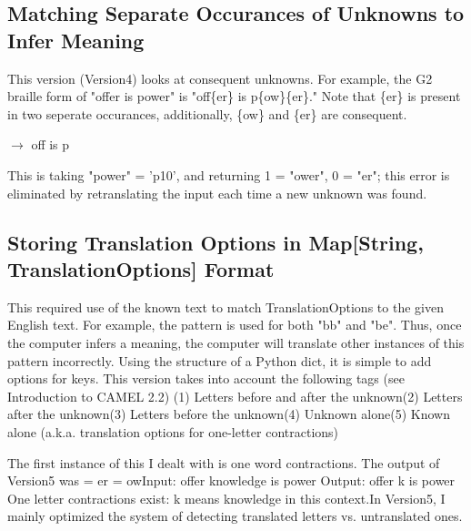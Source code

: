 \documentclass[26pt]{article}
\newcommand*{\code}{\fontfamily{pcr}\selectfont}
\begin{document}
\subsection{Matching Separate Occurances of Unknowns to Infer Meaning}

This version (Version4) looks at consequent unknowns. For example, the G2 braille form of "offer is power" is "off\{er\} is p\{ow\}\{er\}." Note that \{er\} is present in two seperate occurances, additionally, \{ow\} and \{er\} are consequent. 

 $\rightarrow$ off is p 

This is taking "power" = 'p10', and returning 1 = "ower", 0 = "er"; this error is eliminated by retranslating the input each time a new unknown was found.
\newline\newline 

\subsection{Storing Translation Options in Map[String, TranslationOptions] Format}
This required use of the known text to match TranslationOptions to the given English text. For example, the pattern {} is used for both "bb" and "be". Thus, once the computer infers a meaning, the computer will translate other instances of this pattern incorrectly. Using the structure of a Python {\code dict}, it is simple to add options for keys. \newline\newline   This version takes into account the following tags (see Introduction to CAMEL 2.2) \newline (1) Letters before and after the unknown\newline(2) Letters after the unknown\newline(3) Letters before the unknown\newline(4) Unknown alone\newline(5) Known alone (a.k.a. translation options for one-letter contractions)
\newline\newline



The first instance of this I dealt with is one word contractions. The output of Version5 was = er = ow\newline\newline Input: offer knowledge is power \newline\newline Output: offer k is power \newline\newline One letter contractions exist:
k means knowledge in this context.\newline\newline In Version5, I mainly optimized the system of detecting translated letters vs. untranslated ones. 
\end{document}
